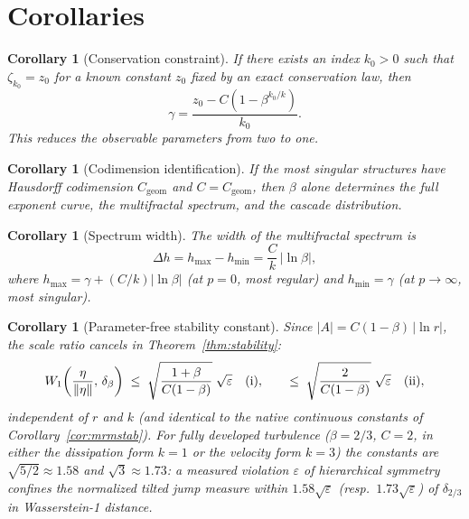 \documentclass[pdflatex,sn-mathphys-num]{sn-jnl}
\theoremstyle{thmstyleone}
\newtheorem{corollary}[theorem]{Corollary}
\theoremstyle{thmstyletwo}
\theoremstyle{thmstylethree}
\begin{document}
\section{Corollaries}
\label{sec:corollaries}

\begin{corollary}[Conservation constraint]\label{cor:conservation}
If there exists an index $k_0 > 0$ such that $\zeta_{k_0} = z_0$ for
a known constant $z_0$ fixed by an exact conservation law, then
\[
  \gamma = \frac{z_0 - C(1-\beta^{k_0/k})}{k_0}.
\]
This reduces the observable parameters from two to one.
\end{corollary}

\begin{corollary}[Codimension identification]\label{cor:codimension}
If the most singular structures have Hausdorff codimension
$C_{\mathrm{geom}}$ and $C = C_{\mathrm{geom}}$, then $\beta$
alone determines the full exponent curve, the multifractal spectrum,
and the cascade distribution.
\end{corollary}

\begin{corollary}[Spectrum width]\label{cor:width}
The width of the multifractal spectrum is
\[
  \Delta h = h_{\max} - h_{\min} = \frac{C}{k}\,|\ln\beta|,
\]
where $h_{\max} = \gamma + (C/k)|\ln\beta|$ (at $p = 0$, most
regular) and $h_{\min} = \gamma$ (at $p \to \infty$, most singular).
\end{corollary}

\begin{corollary}[Parameter-free stability constant]\label{cor:constant}
Since $|A| = C(1-\beta)\,|\ln r|$, the scale ratio cancels in
Theorem~\textup{\ref{thm:stability}}:
\[
  W_1\!\left(\frac{\eta}{\|\eta\|},\,\delta_\beta\right)
  \;\le\; \sqrt{\frac{1+\beta}{C(1-\beta)}}\;\sqrt{\varepsilon}
  \quad\textup{(i)},
  \qquad
  \le\; \sqrt{\frac{2}{C(1-\beta)}}\;\sqrt{\varepsilon}
  \quad\textup{(ii)},
\]
independent of $r$ and $k$ (and identical to the native continuous
constants of Corollary~\ref{cor:mrmstab}).  For fully developed
turbulence ($\beta = 2/3$, $C = 2$, in either the dissipation form
$k=1$ or the velocity form $k=3$) the constants are $\sqrt{5/2}
\approx 1.58$ and $\sqrt{3} \approx 1.73$: a measured violation
$\varepsilon$ of hierarchical symmetry confines the normalized
tilted jump measure within $1.58\sqrt{\varepsilon}$
(resp.\ $1.73\sqrt{\varepsilon}$) of $\delta_{2/3}$ in
Wasserstein-1 distance.
\end{corollary}
\end{document}
